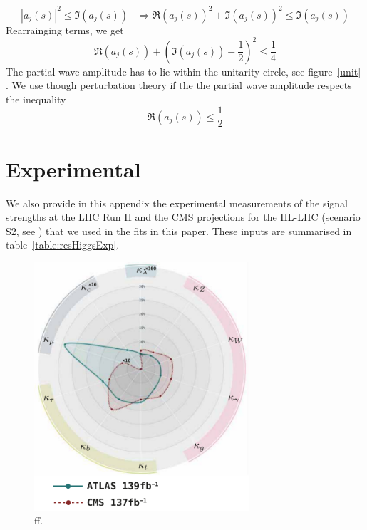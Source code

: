 \begin{equation}
	| a_j(s)|^2 \leq \mathfrak{I} (a_j(s)) \;\;\; \Rightarrow \mathfrak{R} (a_j(s))^2+ \mathfrak{I} (a_j(s))^2 \leq \mathfrak{I} (a_j(s))
\end{equation}
Rearrainging terms, we get
\begin{equation}
	\mathfrak{R} (a_j(s)) +\left( \mathfrak{I} (a_j(s))- \frac{1}{2} \right)^2 \leq \frac{1}{4}
\end{equation}
The partial wave amplitude has to lie within the unitarity circle, see figure~\ref{unit} . We use though perturbation theory if the the partial wave amplitude respects the inequality
\begin{equation}
	\mathfrak{R} (a_j(s)) \leq \frac{1}{2}
\end{equation}

\section{Experimental}
We also provide in this appendix the experimental measurements of the signal strengths at the LHC Run II and the CMS projections for the HL-LHC (scenario S2, see \cite{Cepeda:2019klc}) that we used in the fits in this paper. These inputs are summarised in table~\ref{table:resHiggsExp}.
\begin{figure}[t!]
	\begin{center}
		\includegraphics[width=8cm]{figures/kaappa_higgs}
		\caption{ff.\label{fig:higgs_kappa} }
	\end{center}
\end{figure}
\newpage
\begingroup
 
\endgroup